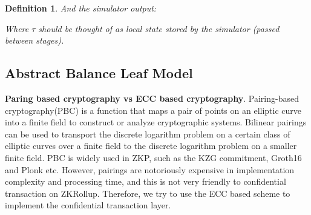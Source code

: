 \documentclass{article}
\newtheorem{myDef}{Definition}
\begin{document}
\begin{myDef}

And the simulator output:

\begin{pchstack}
\end{pchstack}

Where $\tau$ should be thought of as local state stored by the simulator (passed between stages).
\end{myDef}


\subsection{Abstract Balance Leaf Model} \label{section:abl}

\textbf{Paring based cryptography vs ECC based cryptography}.  Pairing-based cryptography(PBC) is a function that maps a pair of points on an elliptic curve into a finite field to construct or analyze cryptographic systems. Bilinear pairings can be used to transport the discrete logarithm problem on a certain class of elliptic curves over a finite field to the discrete logarithm problem on a smaller finite field. PBC is widely used in ZKP, such as the KZG commitment, Groth16 and Plonk etc. However, pairings are notoriously expensive in implementation complexity and processing time, and this is not very friendly to confidential transaction on ZKRollup. Therefore, we try to use the ECC based scheme to implement the confidential transaction layer.
\end{document}
